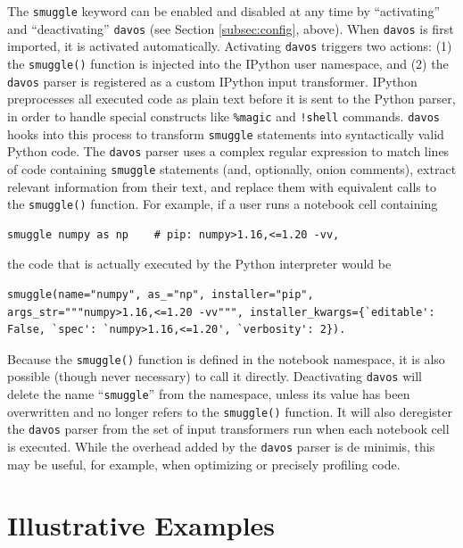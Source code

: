 \documentclass[preprint,12pt,a4paper]{elsarticle}
\begin{document}
The \texttt{smuggle} keyword can be enabled and disabled at any time by ``activating'' and ``deactivating'' \texttt{davos} (see Section \ref{subsec:config}, above). When \texttt{davos} is first imported, it is activated automatically. Activating \texttt{davos} triggers two actions: (1) the \texttt{smuggle()} function is injected into the IPython user namespace, and (2) the \texttt{davos} parser is registered as a custom IPython input transformer. IPython preprocesses all executed code as plain text before it is sent to the Python parser, in order to handle special constructs like \texttt{\%magic} and \texttt{!shell} commands. \texttt{davos} hooks into this process to transform \texttt{smuggle} statements into syntactically valid Python code. The \texttt{davos} parser uses a complex regular expression \cite{Thom68} to match lines of code containing \texttt{smuggle} statements (and, optionally, onion comments), extract relevant information from their text, and replace them with equivalent calls to the \texttt{smuggle()} function. For example, if a user runs a notebook cell containing
\begin{verbatim}
smuggle numpy as np    # pip: numpy>1.16,<=1.20 -vv,
\end{verbatim}
the code that is actually executed by the Python interpreter would be
\begin{verbatim}
smuggle(name="numpy", as_="np", installer="pip", args_str="""numpy>1.16,<=1.20 -vv""", installer_kwargs={`editable': False, `spec': `numpy>1.16,<=1.20', `verbosity': 2}).
\end{verbatim}
Because the \texttt{smuggle()} function is defined in the notebook namespace, it is also possible (though never necessary) to call it directly. Deactivating \texttt{davos} will delete the name ``\texttt{smuggle}'' from the namespace, unless its value has been overwritten and no longer refers to the \texttt{smuggle()} function. It will also deregister the \texttt{davos} parser from the set of input transformers run when each notebook cell is executed. While the overhead added by the \texttt{davos} parser is de minimis, this may be useful, for example, when optimizing or precisely profiling code.




\section{Illustrative Examples}
\end{document}
